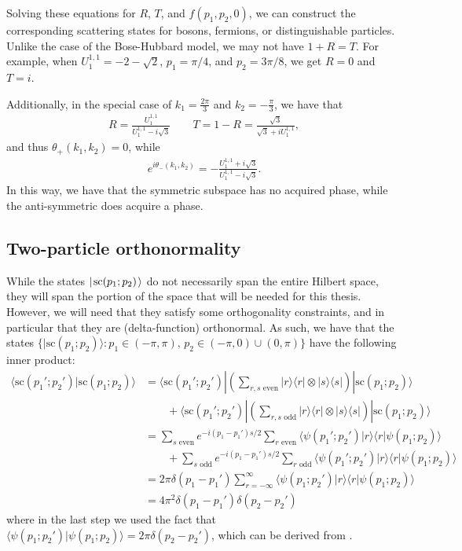 \documentclass[../thesis-main/thesis-main]{subfiles}
\begin{document}
Solving these equations for $R$, $T$, and $f(p_1,p_2,0)$, we can construct the corresponding scattering states for bosons, fermions, or distinguishable particles. Unlike the case of the Bose-Hubbard model, we may not have $1+R=T$. For example, when $U_1^{1,1}=-2-\sqrt{2}$, $p_1={\pi}/{4}$, and $p_2={3\pi}/{8}$, we get $R=0$ and $T=i$. 

Additionally, in the special case of $k_1 = \frac{2\pi}{3}$ and $k_2 = -\frac{\pi}{3}$, we have that 
\begin{align}
  R = \frac{U_1^{1,1}}{U_1^{1,1}-i \sqrt{3}} \qquad T = 1 - R = \frac{ \sqrt{3}}{\sqrt{3} + i U_1^{1,1}},
\end{align}
and thus $\theta_+(k_1,k_2) = 0$, while 
\begin{align}
  e^{i \theta_-(k_1,k_2)} = - \frac{U_1^{1,1} + i \sqrt{3}}{U_1^{1,1} - i \sqrt{3}}.
\end{align}
In this way, we have that the symmetric subspace has no acquired phase, while the anti-symmetric does acquire a phase.

\subsection{Two-particle orthonormality}

While the states $|\mspace{2mu} \mathrm{sc}(p_1;p_2) \mspace{2mu} \rangle$ do not necessarily span the entire Hilbert space, they will span the portion of the space that will be needed for this thesis.  However, we will need that they satisfy some orthogonality constraints, and in particular that they are (delta-function) orthonormal. As such, we have that the states $\{|\mathrm{sc}(p_1;p_2)\rangle \colon p_1\in (-\pi,\pi),\,p_2\in(-\pi,0)\cup(0,\pi)\}$ have the following inner product:
\begin{align}
\langle  \mathrm{sc}(p_1';p_2')|\mathrm{sc}(p_1;p_2)\rangle &= \langle \mathrm{sc}(p_1'; p_2')|\left(\sum_{\text{$r,s$ even}}|r\rangle\langle r| \otimes |s\rangle \langle s| \right)|\mathrm{sc}(p_1;p_2)\rangle\nonumber\\
&\qquad + \langle \mathrm{sc}(p_1'; p_2')|\left(\sum_{\text{$r,s$ odd}}|r\rangle \langle r|\otimes  |s\rangle \langle s|\right)|\mathrm{sc}(p_1;p_2)\rangle\\
&= \sum_{\text{$s$ even}} e^{-i(p_1-p_1') {s}/{2}}\sum_{\text{$r$ even}}\langle \psi(p_1';p_2')|r\rangle\langle r|\psi(p_1;p_2)\rangle\nonumber \\
& \qquad + \sum_{\text{$s$ odd}} e^{-i(p_1-p_1') {s}/{2}}\sum_{\text{$r$ odd}}\langle  \psi(p_1';p_2')|r\rangle\langle r|\psi(p_1;p_2)\rangle\\
&= 2\pi \delta(p_1-p_1') \sum_{r=-\infty}^{\infty}\langle \psi(p_1;p_2')|r\rangle\langle r|\psi(p_1;p_2)\rangle\\
&= 4\pi^2 \delta(p_1-p_1')\delta(p_2-p_2')
\end{align}
where in the last step we used the fact that $\langle\psi(p_1;p_2')|\psi(p_1;p_2)\rangle=2\pi\delta(p_2-p_2')$, which can be derived from .
\end{document}
